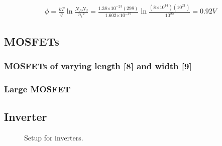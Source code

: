 \documentclass{article}
\providecommand{\e}[1]{\ensuremath{\times 10^{#1}}}
\begin{document}
\begin{align*}
\phi = \frac{kT}{q}\ln{\frac{N_AN_d}{{n_i}^{2}}} = \frac{1.38\e{-23}(298)}{1.602\e{-19}}\ln{\frac{(8\e{14})(10^{21})}{{10^{20}}}} = 0.92 V
\end{align*}

\subsection{MOSFETs}
\subsubsection{MOSFETs of varying length [8] and width [9]}
\subsubsection{Large MOSFET}

\subsection{Inverter}
\begin{figure}[H]
\centering
{}
\caption{Setup for inverters.}
\end{figure}
\end{document}
